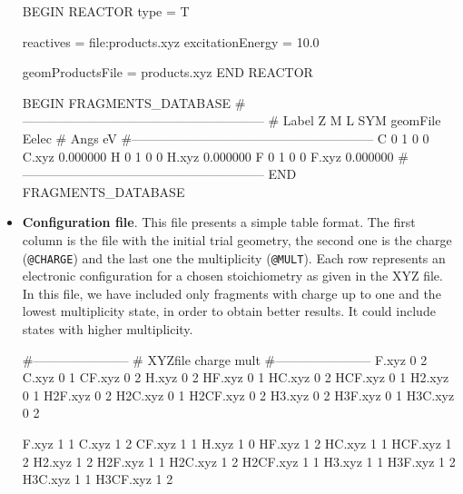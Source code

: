 \documentclass[a4paper,12pt]{article}
\begin{document}
\begin{itemize}
\begin{bifile}[caption=\footnotesize M3C input file for random walker algorithm (reactorT.m3c)]
BEGIN REACTOR
        type = T

        reactives = file:products.xyz
        excitationEnergy = 10.0

        geomProductsFile = products.xyz
END REACTOR

BEGIN FRAGMENTS_DATABASE
        #---------------------------------------------------------
        # Label    Z  M  L  SYM         geomFile            Eelec 
        #                                   Angs               eV 
        #---------------------------------------------------------
              C    0  1  0    0           C.xyz         0.000000
              H    0  1  0    0           H.xyz         0.000000
              F    0  1  0    0           F.xyz         0.000000
        #---------------------------------------------------------
END FRAGMENTS_DATABASE
\end{bifile}

\item
\textbf{Configuration file}.
This file presents a simple table format. The first column is the file with the initial trial geometry, the second one is the
charge (\texttt{@CHARGE}) and the last one the multiplicity (\texttt{@MULT}). Each row represents an electronic configuration
for a chosen stoichiometry as given in the XYZ file. In this file, we have included only fragments with charge up to one and
the lowest multiplicity state, in order to obtain better results. It could include states with higher multiplicity.

\begin{bifile}[caption=\footnotesize Configuration file (fragments.inp)]
#-----------------------
# XYZfile  charge  mult
#-----------------------
    F.xyz     0      2
    C.xyz     0      1
   CF.xyz     0      2
    H.xyz     0      2
   HF.xyz     0      1
   HC.xyz     0      2
  HCF.xyz     0      1
   H2.xyz     0      1
  H2F.xyz     0      2
  H2C.xyz     0      1
 H2CF.xyz     0      2
   H3.xyz     0      2
  H3F.xyz     0      1
  H3C.xyz     0      2

    F.xyz     1      1
    C.xyz     1      2
   CF.xyz     1      1
    H.xyz     1      0
   HF.xyz     1      2
   HC.xyz     1      1
  HCF.xyz     1      2
   H2.xyz     1      2
  H2F.xyz     1      1
  H2C.xyz     1      2
 H2CF.xyz     1      1
   H3.xyz     1      1
  H3F.xyz     1      2
  H3C.xyz     1      1
 H3CF.xyz     1      2
\end{bifile}

\end{itemize}
\end{document}
